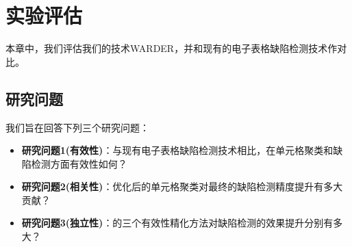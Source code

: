 \chapter{实验评估}

本章中，我们评估我们的技术WARDER，并和现有的电子表格缺陷检测技术作对比。

\section{研究问题}

我们旨在回答下列三个研究问题：

\begin{itemize}
    \item \textbf{研究问题1(有效性)}：与现有电子表格缺陷检测技术相比，\wa 在单元格聚类和缺陷检测方面有效性如何？
    \item \textbf{研究问题2(相关性)}：\wa 优化后的单元格聚类对最终的缺陷检测精度提升有多大贡献？
    \item \textbf{研究问题3(独立性)}：\wa 的三个有效性精化方法对缺陷检测的效果提升分别有多大？
\end{itemize}





